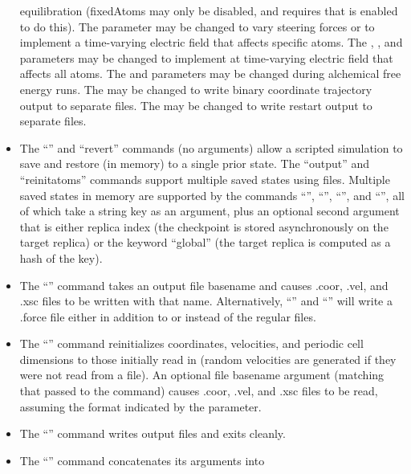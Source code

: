 \begin{itemize}
    equilibration (fixedAtoms may only be disabled, and requires that
     is enabled to do this).
    The  parameter may be changed to vary steering forces
    or to implement a time-varying electric field that affects specific atoms.
    The , , and
     parameters may be changed to implement
    at time-varying electric field that affects all atoms.
    The  and 
    parameters may be changed during alchemical free energy runs.
    The  may be changed to write binary coordinate trajectory
    output to separate files.
    The  may be changed to write restart output to separate files.
 \item The ``'' and ``revert'' commands (no arguments) allow
    a scripted simulation to save and restore (in memory) to a single prior state.
    The ``output'' and ``reinitatoms'' commands support multiple saved states using files.
    Multiple saved states in memory are supported by the commands
    ``'', ``'', ``'', and
    ``'', all of which take a string key as an argument,
    plus an optional second argument that is either
    replica index (the checkpoint is stored asynchronously on the target replica)
    or the keyword ``global'' (the target replica is computed as a hash of the key).
 \item The ``'' command takes an output file basename and causes
    .coor, .vel, and .xsc files to be written with that name.
    Alternatively, ``'' and
    ``'' will write a .force file
    either in addition to or instead of the regular files.
 \item The ``'' command reinitializes coordinates,
    velocities, and periodic cell dimensions to those initially read in
    (random velocities are generated if they were not read from a file).
    An optional file basename argument (matching that passed to the  command)
    causes .coor, .vel, and .xsc files to be read,
    assuming the format indicated by the  parameter.
 \item The ``'' command writes output files and exits cleanly.
 \item The ``'' command concatenates its arguments into

\end{itemize}
